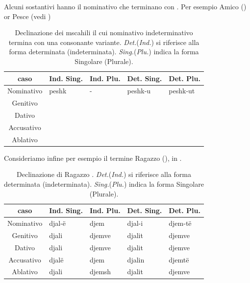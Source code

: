Alcuni sostantivi hanno il nominativo che terminano con . Per esempio Amico () or Pesce (vedi )

\begin{table}[H]
    \centering
    \begin{tabular}{cllll}
        \toprule
        caso        & Ind. Sing.    & Ind. Plu. & Det. Sing.    & Det. Plu. \\
        \midrule
        Nominativo  & peshk         & -         & peshk-u       & peshk-ut \\
        Genitivo    & & & & \\
        Dativo      & & & & \\
        Accusativo  & & & & \\
        Ablativo    & & & & \\
        \bottomrule
    \end{tabular}
    \caption{Declinazione dei mscahili il cui nominativo indeterminativo termina con una consonante variante. \textit{Det.}(\textit{Ind.}) si riferisce alla forma determinata (indeterminata). \textit{Sing.}(\textit{Plu.}) indica la forma Singolare (Plurale).}
    \label{tbl:peshk}
\end{table}

Consideriamo infine per esempio il termine Ragazzo (), in .

\begin{table}[H]
    \centering
    \begin{tabular}{cllll}
        \toprule
        caso        & Ind. Sing.    & Ind. Plu. & Det. Sing.    & Det. Plu. \\
        \midrule
        Nominativo  & djal-ë         & djem      & djal-i         & djem-të \\
        Genitivo    & djali         & djemve    & djalit        & djemve \\
        Dativo      & djali         & djemve    & djalit        & djemve \\
        Accusativo  & djalë         & djem      & djalin        & djemtë \\
        Ablativo    & djali         & djemsh    & djalit        & djemve \\
        \bottomrule
    \end{tabular}
    \caption{Declinazione di Ragazzo . \textit{Det.}(\textit{Ind.}) si riferisce alla forma determinata (indeterminata). \textit{Sing.}(\textit{Plu.}) indica la forma Singolare (Plurale)\cite{slide:grammatica}.}
    \label{tbl:djale}
\end{table}


